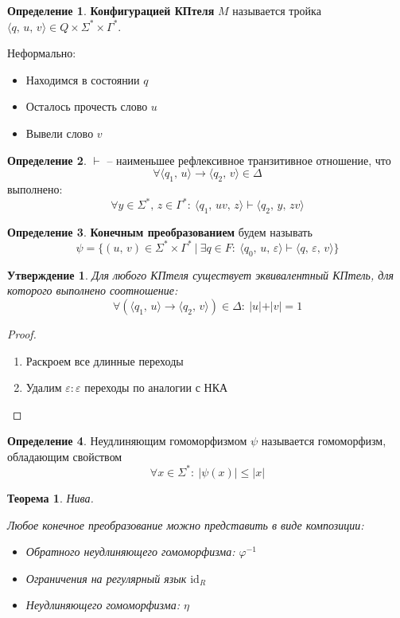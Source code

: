 \documentclass[a4paper,12pt]{article}
\renewcommand{\phi}{\ensuremath{\varphi}}
\renewcommand{\leq}{\ensuremath{\leqslant}}
\theoremstyle{plain}
\newtheorem{theorem}{Теорема}[subsection]
\newtheorem{proposition}{Утверждение}[subsection]
\theoremstyle{definition}
\newtheorem{definition}{Определение}[subsection]
\theoremstyle{remark}
\begin{document}
\begin{definition}
	\textbf{Конфигурацией КПтеля} $M$ называется тройка $\langle q,\,u,\,v\rangle \in Q \times \Sigma^* \times \Gamma^*$.

	Неформально:
	\begin{itemize}
		\item Находимся в состоянии $q$
		\item Осталось прочесть слово $u$
		\item Вывели слово $v$
	\end{itemize}
\end{definition}

\begin{definition}
	$\vdash$ -- наименьшее рефлексивное транзитивное отношение, что
	\[
		\forall \langle q_1,\,u\rangle \to\langle q_2,\, v\rangle \in \Delta
	\]
	выполнено:
	\[
		\forall y \in \Sigma^*,\, z \in \Gamma^* :\: \langle q_1,\, uv,\,z\rangle\vdash\langle q_2,\,y,\,zv\rangle
	\]
\end{definition}

\begin{definition}
	\textbf{Конечным преобразованием} будем называть
	\[
		\psi = \{(u,\,v) \in \Sigma^*\times\Gamma^* \:\vert\: \exists q \in F :\: \langle q_0,\,u,\,\varepsilon\rangle \vdash \langle q,\,\varepsilon,\,v\rangle\}
	\]
\end{definition}

\begin{proposition}
	Для любого КПтеля существует эквивалентный КПтель, для которого выполнено соотношение:
	\[
		\forall(\langle q_1,\,u\rangle\to\langle q_2,\, v\rangle) \in \Delta :\: \vert u\vert + \vert v\vert = 1
	\]
\end{proposition}

\begin{proof}
	\begin{enumerate}
		\item Раскроем все длинные переходы
		\item Удалим $\varepsilon:\varepsilon$ переходы по аналогии с НКА
	\end{enumerate}
\end{proof}

\begin{definition}
	Неудлиняющим гомоморфизмом $\psi$ называется  гомоморфизм, обладающим свойством
	\[
		\forall x \in \Sigma^* :\: \vert \psi(x)\vert \leq \vert x\vert
	\]
\end{definition}

\begin{theorem}
	Нива.

	Любое конечное преобразование можно представить в виде композиции:
	\begin{itemize}
		\item Обратного неудлиняющего гомоморфизма: $\phi^{-1}$
		\item Ограничения на регулярный язык $\text{id}_R$
		\item Неудлиняющего гомоморфизма: $\eta$
	\end{itemize}
\end{theorem}
\end{document}
